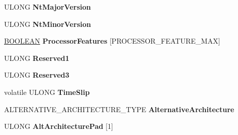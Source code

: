 \begin{DoxyCompactItemize}
\item 
\mbox{\label{struct___k_u_s_e_r___s_h_a_r_e_d___d_a_t_a_a56ed6d4e85cbfbf80e75d8dec5e7356b}} 
U\+L\+O\+NG {\bfseries Nt\+Major\+Version}
\item 
\mbox{\label{struct___k_u_s_e_r___s_h_a_r_e_d___d_a_t_a_aaa835bbc08eb621d9a91e19005dd0319}} 
U\+L\+O\+NG {\bfseries Nt\+Minor\+Version}
\item 
\mbox{\label{struct___k_u_s_e_r___s_h_a_r_e_d___d_a_t_a_a848bed2d8765a25602eb6fb8aae83fa3}} 
\hyperlink{_processor_bind_8h_a112e3146cb38b6ee95e64d85842e380a}{B\+O\+O\+L\+E\+AN} {\bfseries Processor\+Features} \mbox{[}P\+R\+O\+C\+E\+S\+S\+O\+R\+\_\+\+F\+E\+A\+T\+U\+R\+E\+\_\+\+M\+AX\mbox{]}
\item 
\mbox{\label{struct___k_u_s_e_r___s_h_a_r_e_d___d_a_t_a_ab359e9fc93516c05163e5211e43b20d8}} 
U\+L\+O\+NG {\bfseries Reserved1}
\item 
\mbox{\label{struct___k_u_s_e_r___s_h_a_r_e_d___d_a_t_a_ad67a02f1eeb2603704aa9a928e776d8d}} 
U\+L\+O\+NG {\bfseries Reserved3}
\item 
\mbox{\label{struct___k_u_s_e_r___s_h_a_r_e_d___d_a_t_a_a9d5759c2fb5a3e591c92c5690c4ffb3c}} 
volatile U\+L\+O\+NG {\bfseries Time\+Slip}
\item 
\mbox{\label{struct___k_u_s_e_r___s_h_a_r_e_d___d_a_t_a_ad78780eac1ac3b03029e25c19fc46a02}} 
A\+L\+T\+E\+R\+N\+A\+T\+I\+V\+E\+\_\+\+A\+R\+C\+H\+I\+T\+E\+C\+T\+U\+R\+E\+\_\+\+T\+Y\+PE {\bfseries Alternative\+Architecture}
\item 
\mbox{\label{struct___k_u_s_e_r___s_h_a_r_e_d___d_a_t_a_ae0f8b00ff807ba47a3fc319b245f73b1}} 
U\+L\+O\+NG {\bfseries Alt\+Architecture\+Pad} \mbox{[}1\mbox{]}
\item 
\mbox{\label{struct___k_u_s_e_r___s_h_a_r_e_d___d_a_t_a_a9f16cb03e6ab44fdc4a5db8b7b4e8bff}} 

\end{DoxyCompactItemize}

